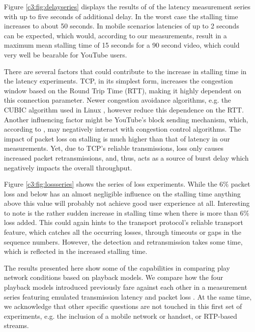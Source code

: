 Figure \ref{c3:fig:delayseries} displays the results of of the latency measurement series with up to five seconds of additional delay. In the worst case the stalling time increases to about 50 seconds. In mobile scenarios latencies of up to 2 seconds can be expected, which would, according to our measurements, result in a maximum mean stalling time of 15 seconds for a 90 second video, which could very well be bearable for YouTube users.

There are several factors that could contribute to the increase in stalling time in the latency experiments. 
TCP, in its simplest form, increases the congestion window based on the Round Trip Time (RTT), making it highly dependent on this connection parameter. Newer congestion avoidance algorithms, e.g. the CUBIC algorithm used in Linux \cite{ha2008cubic}, however reduce this dependence on the RTT.
Another influencing factor might be YouTube's block sending mechanism, which, according to \cite{alcock2011afcyt}, may negatively interact with congestion control algorithms. The impact of packet loss on stalling is much higher than that of latency in our measurements. Yet, due to TCP's reliable transmissions, loss only causes increased packet retransmissions, and, thus, acts as a source of burst delay which negatively impacts the overall throughput.

Figure \ref{c3:fig:lossseries} shows the series of loss experiments. While the 6\% packet loss and below has an almost negligible influence on the stalling time anything above this value will probably not achieve good user experience at all. Interesting to note is the rather sudden increase in stalling time when there is more than 6\% loss added. This could again hints to the transport protocol's reliable transport feature, which catches all the occurring losses, through timeouts or gaps in the sequence numbers. However, the detection and retransmission takes some time, which is reflected in the increased stalling time.



The results presented here show some of the capabilities in comparing play network conditions based on playback models. We compare how the four playback models introduced previously fare against each other in a measurement series featuring  emulated transmission latency and packet loss . At the same time, we acknowledge that other specific questions are not touched in this first set of experiments, e.g. the inclusion of a mobile network or handset, or RTP-based streams.

